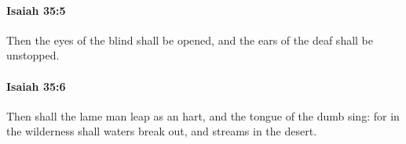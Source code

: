 		\paragraph{Isaiah 35:5} %
			\label{ISAIAH-35-5}

			Then the eyes of the blind shall be opened, and the ears of the deaf shall be unstopped.


		\paragraph{Isaiah 35:6} %
			\label{ISAIAH-35-6}

			Then shall the lame man leap as an hart, and the tongue of the dumb sing: for in the wilderness shall waters break out, and streams in the desert.


